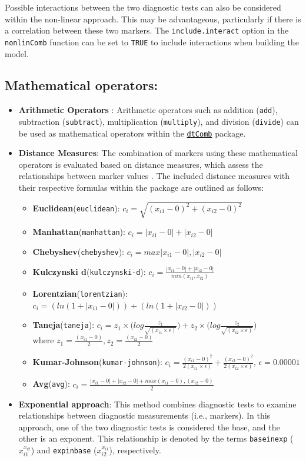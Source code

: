 \documentclass[10pt]{article}
\newcommand{\CRANpkg}[1]{\href{https://CRAN.R-project.org/package=#1}{\texttt{#1}}}
\newcommand{\Rfunction}[1]{\texttt{#1}}
\begin{document}
Possible interactions between the two diagnostic tests can also be considered within the non-linear approach. This may be advantageous, particularly if there is a correlation between these two markers.  The \texttt{include.interact} option in the \Rfunction{nonlinComb} function can be set to \texttt{TRUE} to include interactions when building the model.
\subsection{Mathematical operators:}
\begin{itemize}
  \item \textbf{Arithmetic Operators} : Arithmetic operators such as addition (\texttt{add}), subtraction (\texttt{subtract}), multiplication (\texttt{multiply}), and division (\texttt{divide}) can be used as mathematical operators within the \CRANpkg{dtComb} package.
  \item \textbf{Distance Measures}: The combination of markers using these mathematical operators is evaluated based on distance measures, which assess the relationships between marker values \citep{cha2007comprehensive,pandit2011comparative, minaev2018distance}. The included distance measures with their respective formulas within the package are outlined as follows:
    \begin{itemize}
      \item \textbf{Euclidean}(\texttt{euclidean}): $c_i= { \sqrt{(x_{i1}-0)^2+(x_{i2}-0)^2}}$
      \item \textbf{Manhattan}(\texttt{manhattan}): $c_i = |x_{i1}-0|+|x_{i2}-0|$
      \item \textbf{Chebyshev}(\texttt{chebyshev}): $c_i = max{|x_{i1}-0|,|x_{i2}-0|}$
      \item \textbf{Kulczynski d}(\texttt{kulczynski-d}): $c_i = \frac{|x_{i1}-0|+|x_{i2}-0|}{min(x_{i1},x_{i2})}$ 
      \item \textbf{Lorentzian}(\texttt{lorentzian}): $c_i = (ln(1+|x_{i1}-0|))+ (ln(1+|x_{i2}-0|))$
      \item \textbf{Taneja}(\texttt{taneja}): $c_i = z_1\times\Biggl(log\frac{z_1}{\sqrt{(x_{i1}\times\epsilon )}}\Biggl)+z_2\times\Biggl(log\frac{z_2}{\sqrt{(x_{i2}\times\epsilon)}}\Biggl)$\\
      where $z_1 = \frac{(x_{i1}-0)}{2}, z_2 = \frac{(x_{i2}-0)}{2}$
            \item \textbf{Kumar-Johnson}(\texttt{kumar-johnson}): $c_i = {\frac{(x_{i1}-0)^2}{2(x_{i1}\times\epsilon)}}+{\frac{(x_{i2}-0)^2}{2(x_{i2}\times\epsilon)}}$, $\epsilon = 0.00001$
            \item \textbf{Avg}(\texttt{avg}): $c_i = \frac{|x_{i1}-0|+|x_{i2}-0| + max{(x_{i1}-0),(x_{i2}-0)}}{2}$
    \end{itemize}
  \item \textbf{Exponential approach}: This method combines diagnostic tests to examine relationships between diagnostic measurements (i.e., markers). In this approach, one of the two diagnostic tests is considered the base, and the other is an exponent. This relationship is denoted by the terms \texttt{baseinexp} ($x_{i1}^{x_{i2}}$) and \texttt{expinbase} ($x_{i2}^{x_{i1}}$), respectively.
\end{itemize}
\end{document}
